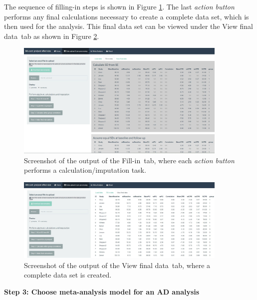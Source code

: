 \documentclass[AMA,STIX1COL]{WileyNJD-v2}
\begin{document}
The sequence of filling-in steps is shown in Figure \ref{fig: shiny-fillin_output}. The last \textit{action button} performs any final calculations necessary to create a complete data set, which is then used for the analysis. This final data set can be viewed under the \textquotesingle View final data\textquotesingle\ tab as shown in Figure \ref{fig: shiny-final_data}.

\begin{figure}[t]
  \centering \includegraphics[width=0.9\textwidth]{fill_some.JPG}
    \caption{\small {Screenshot of the output of the \textquotesingle Fill-in\textquotesingle\ tab, where each \textit{action button} performs a calculation/imputation task.}} \label{fig: shiny-fillin_output}
\end{figure}

\begin{figure}[h]
  \centering \includegraphics[width=0.9\textwidth]{final_data.JPG}
    \caption{\small {Screenshot of the output of the \textquotesingle View final data\textquotesingle\ tab, where a complete data set is created.}} \label{fig: shiny-final_data}
\end{figure}

\vspace{0.1cm}
\clearpage

\textbf{Step 3: Choose meta-analysis model for an AD analysis}
\vspace{0.1cm}
\end{document}
